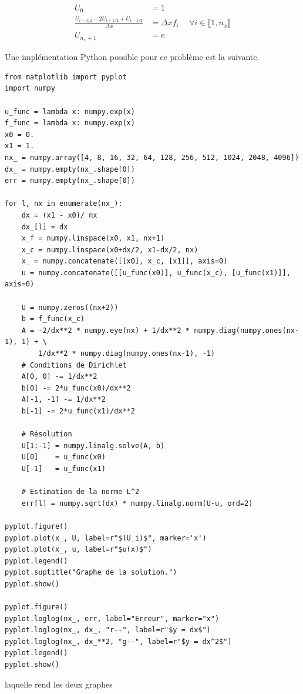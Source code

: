 \begin{align*}
    U_0 & = 1 \\
    \frac{U_{i+3/2} - 2 U_{i+1/2} + U_{i-1/2}}{\Delta x} & = \Delta x f_i \hspace{15pt} \forall i \in \llbracket 1, n_x \rrbracket \\
    U_{n_x+1} & = e
\end{align*}

Une implémentation Python possible pour ce problème est la suivante.
\begin{verbatim}
from matplotlib import pyplot
import numpy

u_func = lambda x: numpy.exp(x)
f_func = lambda x: numpy.exp(x)
x0 = 0.
x1 = 1.
nx_ = numpy.array([4, 8, 16, 32, 64, 128, 256, 512, 1024, 2048, 4096])
dx_ = numpy.empty(nx_.shape[0])
err = numpy.empty(nx_.shape[0])

for l, nx in enumerate(nx_):
    dx = (x1 - x0)/ nx
    dx_[l] = dx
    x_f = numpy.linspace(x0, x1, nx+1)
    x_c = numpy.linspace(x0+dx/2, x1-dx/2, nx)
    x_ = numpy.concatenate([[x0], x_c, [x1]], axis=0)
    u = numpy.concatenate([[u_func(x0)], u_func(x_c), [u_func(x1)]], axis=0)
    
    U = numpy.zeros((nx+2))
    b = f_func(x_c)
    A = -2/dx**2 * numpy.eye(nx) + 1/dx**2 * numpy.diag(numpy.ones(nx-1), 1) + \
        1/dx**2 * numpy.diag(numpy.ones(nx-1), -1)
    # Conditions de Dirichlet
    A[0, 0] -= 1/dx**2
    b[0] -= 2*u_func(x0)/dx**2
    A[-1, -1] -= 1/dx**2
    b[-1] -= 2*u_func(x1)/dx**2
    
    # Résolution
    U[1:-1] = numpy.linalg.solve(A, b)
    U[0]    = u_func(x0)
    U[-1]   = u_func(x1)
    
    # Estimation de la norme L^2
    err[l] = numpy.sqrt(dx) * numpy.linalg.norm(U-u, ord=2)
    
pyplot.figure()
pyplot.plot(x_, U, label=r"$(U_i)$", marker='x')
pyplot.plot(x_, u, label=r"$u(x)$")
pyplot.legend()
pyplot.suptitle("Graphe de la solution.")
pyplot.show()

pyplot.figure()
pyplot.loglog(nx_, err, label="Erreur", marker="x")
pyplot.loglog(nx_, dx_, "r--", label=r"$y = dx$")
pyplot.loglog(nx_, dx_**2, "g--", label=r"$y = dx^2$")
pyplot.legend()
pyplot.show()
\end{verbatim}
laquelle rend les deux graphes
